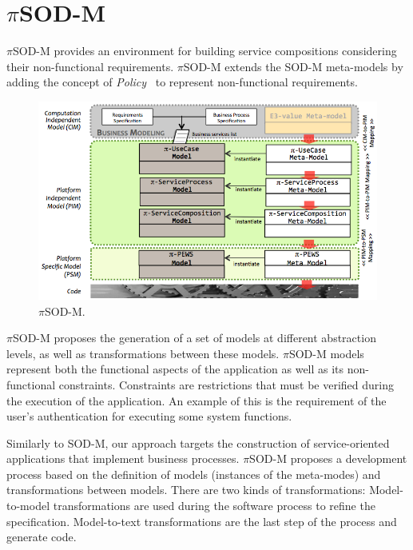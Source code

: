 \section{$\pi$SOD-M}\label{sec:pisodm}

$\pi$SOD-M provides an environment for building service compositions considering
their non-functional requirements. 
$\pi$SOD-M extends the SOD-M meta-models by adding
the concept of \textit{Policy}~\cite{Espinosa-Oviedo2011a}
to represent non-functional requirements.

\begin{figure}[h]
\centering
\includegraphics[width=1.0\textwidth]{figs/piSODM}
\caption{$\pi$SOD-M.}
\label{fig:piSOD-M}
\end{figure}

$\pi$SOD-M proposes the generation of a set of models at different abstraction levels, as
well as transformations between these models.
$\pi$SOD-M models represent both the functional aspects of the application as well as its non-functional constraints. 
Constraints are restrictions that must be verified during the execution of the application. 
An example of this is the requirement of the user's authentication for executing some system functions. 

Similarly to SOD-M, our approach targets the construction of service-oriented applications that implement business processes.
$\pi$SOD-M proposes a development process based on the definition of models
(instances of the meta-modes) and transformations between models.
There are two kinds of transformations:
Model-to-model transformations are used during the software process to refine the specification.
Model-to-text transformations are the last step of the process and generate code.

